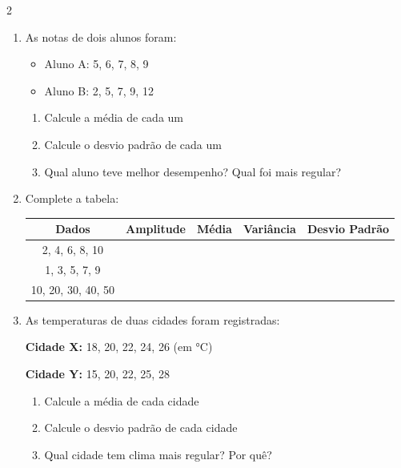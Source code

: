 \documentclass[11pt]{article}
\begin{document}
\begin{multicols}{2}
\begin{enumerate}[leftmargin=*]
\end{enumerate}

\begin{enumerate}[leftmargin=*, start=7]

\item As notas de dois alunos foram:
\begin{itemize}
\item Aluno A: 5, 6, 7, 8, 9
\item Aluno B: 2, 5, 7, 9, 12
\end{itemize}
\begin{enumerate}[label=\alph*)]
\item Calcule a média de cada um
\item Calcule o desvio padrão de cada um
\item Qual aluno teve melhor desempenho? Qual foi mais regular?
\end{enumerate}

\item Complete a tabela:

\begin{center}
\hspace*{-0.9cm}
\footnotesize
\setlength{\tabcolsep}{4pt}
\renewcommand{\arraystretch}{0.8}
\begin{tabular}{|c|c|c|c|c|}
\hline
\textbf{Dados} & \textbf{Amplitude} & \textbf{Média} & \textbf{Variância} & \textbf{Desvio Padrão} \\
\hline
2, 4, 6, 8, 10 & & & & \\
\hline
1, 3, 5, 7, 9 & & & & \\
\hline
10, 20, 30, 40, 50 & & & & \\
\hline
\end{tabular}
\end{center}

\item As temperaturas de duas cidades foram registradas:

\textbf{Cidade X:} 18, 20, 22, 24, 26 (em °C)

\textbf{Cidade Y:} 15, 20, 22, 25, 28

\begin{enumerate}[label=\alph*)]
\item Calcule a média de cada cidade
\item Calcule o desvio padrão de cada cidade
\item Qual cidade tem clima mais regular? Por quê?
\end{enumerate}


\end{enumerate}
\end{multicols}
\end{document}
